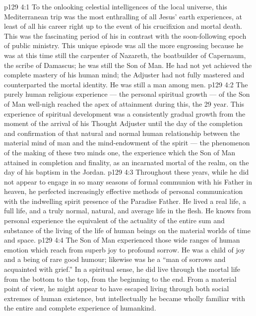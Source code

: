 \vs p129 4:1 To the onlooking celestial intelligences of the local universe, this Mediterranean trip was the most enthralling of all Jesus’ earth experiences, at least of all his career right up to the event of his crucifixion and mortal death. This was the fascinating period of his  in contrast with the soon\hyp{}following epoch of public ministry. This unique episode was all the more engrossing because he was at this time still the carpenter of Nazareth, the boatbuilder of Capernaum, the scribe of Damascus; he was still the Son of Man. He had not yet achieved the complete mastery of his human mind; the Adjuster had not fully mastered and counterparted the mortal identity. He was still a man among men.
\vs p129 4:2 The purely human religious experience --- the personal spiritual growth --- of the Son of Man well\hyp{}nigh reached the apex of attainment during this, the 29 year. This experience of spiritual development was a consistently gradual growth from the moment of the arrival of his Thought Adjuster until the day of the completion and confirmation of that natural and normal human relationship between the material mind of man and the mind\hyp{}endowment of the spirit --- the phenomenon of the making of these two minds one, the experience which the Son of Man attained in completion and finality, as an incarnated mortal of the realm, on the day of his baptism in the Jordan.
\vs p129 4:3 Throughout these years, while he did not appear to engage in so many seasons of formal communion with his Father in heaven, he perfected increasingly effective methods of personal communication with the indwelling spirit presence of the Paradise Father. He lived a real life, a full life, and a truly normal, natural, and average life in the flesh. He knows from personal experience the equivalent of the actuality of the entire sum and substance of the living of the life of human beings on the material worlds of time and space.
\vs p129 4:4 The Son of Man experienced those wide ranges of human emotion which reach from superb joy to profound sorrow. He was a child of joy and a being of rare good humour; likewise was he a “man of sorrows and acquainted with grief.” In a spiritual sense, he did live through the mortal life from the bottom to the top, from the beginning to the end. From a material point of view, he might appear to have escaped living through both social extremes of human existence, but intellectually he became wholly familiar with the entire and complete experience of humankind.
